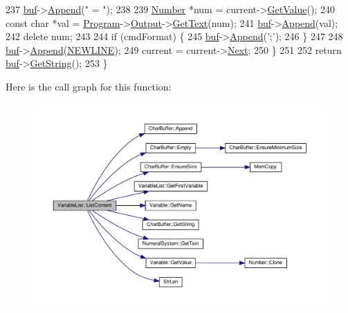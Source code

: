 \begin{DoxyCode}
237         \hyperlink{classVariableList_a11bf03542fab82869135f3f300890376}{buf}->\hyperlink{classCharBuffer_a045b38735f7b3007c1b98d3d7b7feafe}{Append}(\textcolor{stringliteral}{" = "});
238 
239         \hyperlink{structNumber}{Number} *num = current->\hyperlink{classVariable_adb77b2681374245b5d606a1d149d0d91}{GetValue}();
240         \textcolor{keyword}{const} \textcolor{keywordtype}{char} *val = \hyperlink{classProgram}{Program}->\hyperlink{classProgram_ac6e84e81a8bbdf99de5beea93713d8ee}{Output}->\hyperlink{classNumeralSystem_a74dc91c4dbab4a88a123b2a32753f485}{GetText}(num);
241         \hyperlink{classVariableList_a11bf03542fab82869135f3f300890376}{buf}->\hyperlink{classCharBuffer_a045b38735f7b3007c1b98d3d7b7feafe}{Append}(val);
242         \textcolor{keyword}{delete} num;
243 
244         \textcolor{keywordflow}{if} (cmdFormat) \{
245             \hyperlink{classVariableList_a11bf03542fab82869135f3f300890376}{buf}->\hyperlink{classCharBuffer_a045b38735f7b3007c1b98d3d7b7feafe}{Append}(\textcolor{charliteral}{';'});
246         \}
247 
248         \hyperlink{classVariableList_a11bf03542fab82869135f3f300890376}{buf}->\hyperlink{classCharBuffer_a045b38735f7b3007c1b98d3d7b7feafe}{Append}(\hyperlink{platform_8h_a806511f4930171733227c99101dc0606}{NEWLINE});
249         current = current->\hyperlink{classVariable_ac5662d23fccccf25e3565793841ce580}{Next};
250     \}
251 
252     \textcolor{keywordflow}{return} \hyperlink{classVariableList_a11bf03542fab82869135f3f300890376}{buf}->\hyperlink{classCharBuffer_a7dfd3feaaf80f318ba44efe15b1ec44b}{GetString}();
253 \}
\end{DoxyCode}


Here is the call graph for this function\+:\nopagebreak
\begin{figure}[H]
\begin{center}
\leavevmode
\includegraphics[width=350pt]{classVariableList_a2898791757231a476a994741a0f8ab94_cgraph}
\end{center}
\end{figure}




